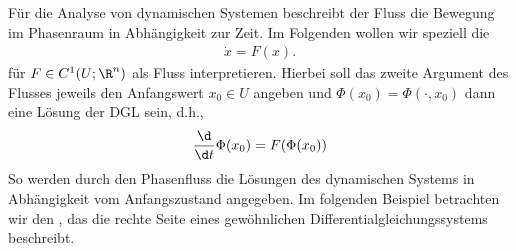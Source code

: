 \documentclass[letterpaper,10pt,german]{jupyterBook}
\begin{document}
\sphinxAtStartPar
Für die Analyse von dynamischen Systemen beschreibt der Fluss die Bewegung im Phasenraum in Abhängigkeit zur Zeit.
Im Folgenden wollen wir speziell die 
\begin{equation*}
\begin{split}\dot{x} = F(x).\end{split}
\end{equation*}
\sphinxAtStartPar
für \(F\in C^1(U;\R^n)\) als Fluss interpretieren.
Hierbei soll das zweite Argument des Flusses jeweils den Anfangswert \(x_0\in U\) angeben und \(\Phi(x_0) = \Phi(\cdot, x_0)\) dann eine Lösung der DGL sein, d.h.,
\begin{equation*}
\begin{split}\frac{\d}{\d t} \Phi(x_0) = F(\Phi(x_0))\end{split}
\end{equation*}
\sphinxAtStartPar
So werden durch den Phasenfluss die Lösungen des dynamischen Systems in Abhängigkeit vom Anfangszustand angegeben.
Im folgenden Beispiel betrachten wir den , das die rechte Seite eines gewöhnlichen Differentialgleichungssystems beschreibt.
\label{ode/fluesse:example-1}
\end{document}
